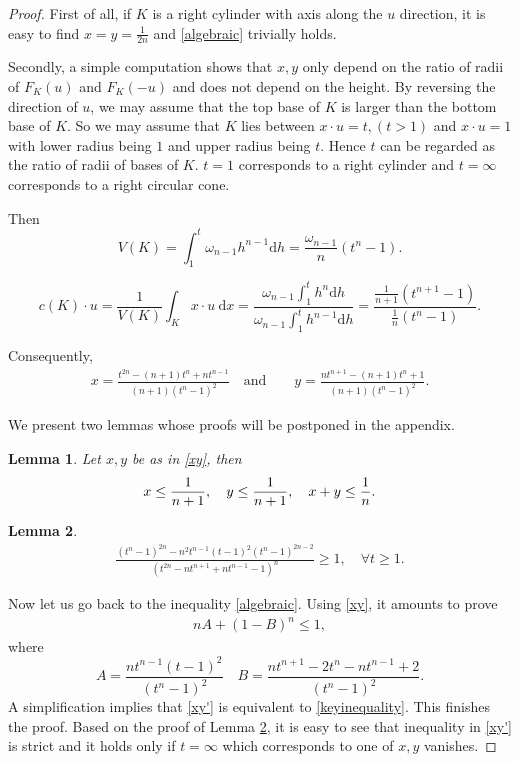 \documentclass[12pt]{amsart}
\newtheorem{lemma}{Lemma}
\numberwithin{equation}{section}
\numberwithin{lemma}{section}
\numberwithin{proposition}{section}
\numberwithin{corollary}{section}
\numberwithin{remark}{section}
\begin{document}
\begin{proof}
First of all, if $K$ is a right cylinder with axis along the $u$ direction, it is easy to find $x=y=\frac{1}{2n}$ and \eqref{algebraic} trivially holds.  

Secondly, a simple computation shows that $x,y$ only depend on the ratio of radii of $F_{K}(u)$ and $F_{K}(-u)$ and does not depend on the height. By reversing the direction of $u$, we may assume that the top base of $K$ is larger than the bottom base of $K$. So we may assume that $K$ lies between $x\cdot u=t, (t>1)$ and $x\cdot u=1$ with lower radius being $1$ and upper radius being $t$. Hence $t$ can be regarded as the ratio of radii of bases of $K$. $t=1$ corresponds to a right cylinder and $t=\infty$ corresponds to a right circular cone. 

Then
\[
V(K)  =\int_1^t \omega_{n-1} h^{n-1} \mathrm{d} h=\frac{\omega_{n-1}}{n}\left(t^n-1\right).
\]

\[
c(K) \cdot u  =\frac{1}{V(K)} \int_K x \cdot u \mathrm{~d} x=\frac{\omega_{n-1}\int_1^t  h^{n} \mathrm{d} h}{\omega_{n-1}\int_1^t h^{n-1} \mathrm{d} h} =\frac{\frac{1}{n+1}\left(t^{n+1}-1\right)}{\frac{1}{n}\left(t^n-1\right)}.
\]

Consequently, 
\begin{align} \label{xy}
x=\frac{t^{2 n}-(n+1) t^n+n t^{n-1}}{(n+1)\left(t^n-1\right)^2} \quad \text{and} \quad  \quad y=\frac{n t^{n+1}-(n+1) t^n+1}{(n+1)\left(t^n-1\right)^2}.
\end{align}

We present two lemmas whose proofs will be postponed in the appendix. 

\begin{lemma} \label{L1}
Let $x,y$ be as in \eqref{xy}, then
    \begin{align} \notag
    x\leq \frac{1}{n+1}, \quad y\leq \frac{1}{n+1}, \quad x+y\leq \frac{1}{n}.
\end{align}
\end{lemma}

\begin{lemma} \label{L2}
        \begin{align} \label{keyinequality}
\frac{\left(t^n-1\right)^{2 n}-n^2 t^{n-1}(t-1)^2\left(t^n-1\right)^{2 n-2}}{\left(t^{2 n}-n t^{n+1}+n t^{n-1}-1\right)^n} \geq 1, \quad \forall t\geq 1.
\end{align}
\end{lemma}

Now let us go back to the inequality \eqref{algebraic}. Using \eqref{xy}, it amounts to prove  
\begin{align} \label{xy'}
    n A+(1-B)^n \leq 1,
\end{align}
where
\[
 A=\frac{n t^{n-1}(t-1)^2}{\left(t^n-1\right)^2}  \quad 
B=\frac{n t^{n+1}-2 t^n-n t^{n-1}+2}{\left(t^n-1\right)^2}.
\]
A simplification implies that \eqref{xy'} is equivalent to \eqref{keyinequality}. This finishes the proof. Based on the proof of Lemma \ref{L2}, it is easy to see that inequality in \eqref{xy'} is strict and it holds only if $t=\infty$ which corresponds to one of $x, y$ vanishes. 

\end{proof}
\end{document}
